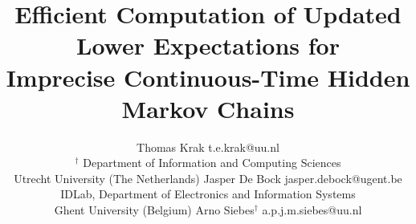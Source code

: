 \documentclass[twoside,11pt]{article}
\begin{document}


\title{Efficient Computation of Updated Lower Expectations for\\ Imprecise Continuous-Time Hidden Markov Chains}
\author{\name Thomas Krak \email t.e.krak@uu.nl\\
\addr $^\dagger$ Department of Information and Computing Sciences\\
Utrecht University (The Netherlands)
\AND
\name Jasper De Bock \email jasper.debock@ugent.be\\
\addr IDLab, Department of Electronics and Information Systems\\
Ghent University (Belgium)
\AND
\name Arno Siebes$^\dagger$ \email a.p.j.m.siebes@uu.nl
}
\maketitle

\end{document}
